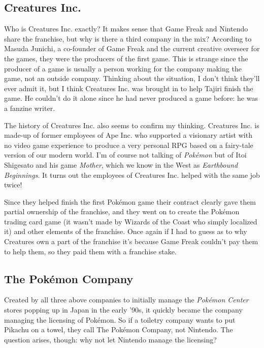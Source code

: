 \documentclass{book}
\begin{document}
\subsection*{Creatures Inc.}\nopagebreak[4]

Who is Creatures Inc. exactly? It makes sense that Game Freak and Nintendo share the franchise, but why is there a third company in the mix? According to Masuda Junichi, a co-founder of Game Freak and the current creative overseer for the games, they were the producers of the first game. This is strange since the producer of a game is usually a person working for the company making the game, not an outside company. Thinking about the situation, I don’t think they’ll ever admit it, but I think Creatures Inc. was brought in to help Tajiri finish the game. He couldn’t do it alone since he had never produced a game before: he was a fanzine writer.

The history of Creatures Inc. also seems to confirm my thinking. Creatures Inc. is made-up of former employees of Ape Inc. who supported a visionary artist with no video game experience to produce a very personal RPG based on a fairy-tale version of our modern world. I’m of course not talking of \emph{Pokémon} but of Itoi Shigesato and his game \emph{Mother}, which we know in the West as \emph{Earthbound Beginnings}. It turns out the employees of Creatures Inc. helped with the same job twice!

Since they helped finish the first Pokémon game their contract clearly gave them partial ownership of the franchise, and they went on to create the Pokémon trading card game (it wasn’t made by Wizards of the Coast who simply localized it) and other elements of the franchise. Once again if I had to guess as to why Creatures own a part of the franchise it’s because Game Freak couldn’t pay them to help them, so they paid them with a franchise stake.

\subsection*{The Pokémon Company}\nopagebreak[4]

Created by all three above companies to initially manage the \emph{Pokémon Center} stores popping up in Japan in the early ’90s, it quickly became the company managing the licensing of Pokémon. So if a toiletry company wants to put Pikachu on a towel, they call The Pokémon Company, not Nintendo. The question arises, though: why not let Nintendo manage the licensing?
\end{document}
